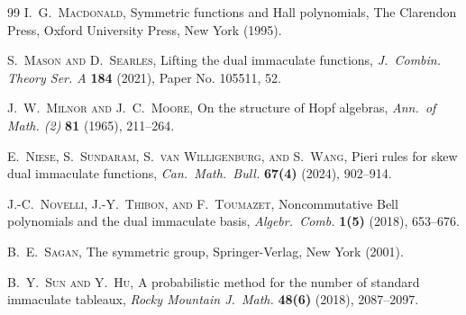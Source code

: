 \documentclass{amsart}
\theoremstyle{definition}
\begin{document}
\begin{thebibliography}{99}
 \textsc{I.\ G.\ Macdonald}, 
 Symmetric functions and {H}all polynomials, 
 The Clarendon Press, Oxford University Press, New York (1995). 

 \textsc{S.\ Mason and D.\ Searles}, 
 Lifting the dual immaculate functions, 
 \emph{J.\ Combin. Theory Ser. A} {\bf 184} (2021), Paper No. 105511, 52. 

 \textsc{J.\ W.\ Milnor and J.\ C.\ Moore}, 
 On the structure of {H}opf algebras, 
 \emph{Ann.\ of Math. (2)} {\bf 81}
 (1965), 211--264. 

 \textsc{E.\ Niese, S.\ Sundaram, S.\ van Willigenburg, and S.\ Wang}, 
 Pieri rules for skew dual immaculate functions, 
 \emph{Can.\ Math.\ Bull.} {\bf 67(4)} (2024), 902--914. 

 \textsc{J.-C.\ Novelli, J.-Y.\ Thibon, and F.\ Toumazet}, 
 Noncommutative {Bell} polynomials and the dual immaculate basis, 
 \emph{Algebr.\ Comb.} {\bf 1(5)} (2018), 653--676. 

 \textsc{B.\ E.\ Sagan}, 
 The symmetric group, 
 Springer-Verlag, New York (2001). 

 \textsc{B.\ Y.\ Sun and Y.\ Hu}, 
 A probabilistic method for the number of standard immaculate tableaux, 
 \emph{Rocky Mountain J.\ Math.} {\bf 48(6)} 
 (2018), 2087--2097. 

\end{thebibliography}
\end{document}
